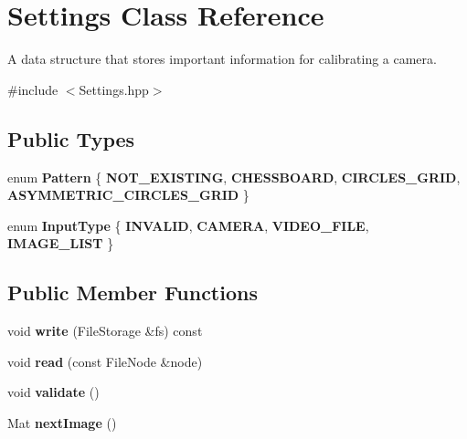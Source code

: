 \hypertarget{class_settings}{}\section{Settings Class Reference}
\label{class_settings}


A data structure that stores important information for calibrating a camera.  




{\ttfamily \#include $<$Settings.\+hpp$>$}

\subsection*{Public Types}
\begin{DoxyCompactItemize}
\item 
\mbox{\label{class_settings_a0e7117abd9427a6f8bc1d1d8d456b5c8}} 
enum {\bfseries Pattern} \{ {\bfseries N\+O\+T\+\_\+\+E\+X\+I\+S\+T\+I\+NG}, 
{\bfseries C\+H\+E\+S\+S\+B\+O\+A\+RD}, 
{\bfseries C\+I\+R\+C\+L\+E\+S\+\_\+\+G\+R\+ID}, 
{\bfseries A\+S\+Y\+M\+M\+E\+T\+R\+I\+C\+\_\+\+C\+I\+R\+C\+L\+E\+S\+\_\+\+G\+R\+ID}
 \}
\item 
\mbox{\label{class_settings_a5afe85d24b071973a7f248c05386f7f4}} 
enum {\bfseries Input\+Type} \{ {\bfseries I\+N\+V\+A\+L\+ID}, 
{\bfseries C\+A\+M\+E\+RA}, 
{\bfseries V\+I\+D\+E\+O\+\_\+\+F\+I\+LE}, 
{\bfseries I\+M\+A\+G\+E\+\_\+\+L\+I\+ST}
 \}
\end{DoxyCompactItemize}
\subsection*{Public Member Functions}
\begin{DoxyCompactItemize}
\item 
\mbox{\label{class_settings_a0785cc2055091b2a857b1dcefe291acc}} 
void {\bfseries write} (File\+Storage \&fs) const
\item 
\mbox{\label{class_settings_a2d7841f8441095032e0f3b7d20adfd3f}} 
void {\bfseries read} (const File\+Node \&node)
\item 
\mbox{\label{class_settings_a29016205c90b95d6247df18365a70dd0}} 
void {\bfseries validate} ()
\item 
\mbox{\label{class_settings_a7701462e928f2425b342440fba9973e5}} 
Mat {\bfseries next\+Image} ()
\end{DoxyCompactItemize}
